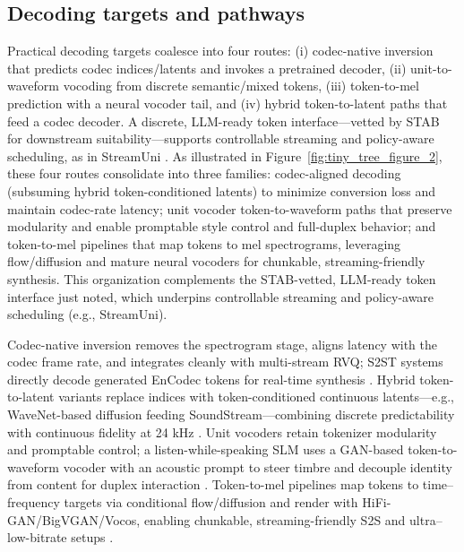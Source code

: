 \documentclass{article}
\begin{document}
\subsection{Decoding targets and pathways} \label{subsec:decodingtargetsandpathways}
Practical decoding targets coalesce into four routes: (i) codec-native inversion that predicts codec indices/latents and invokes a pretrained decoder, (ii) unit-to-waveform vocoding from discrete semantic/mixed tokens, (iii) token-to-mel prediction with a neural vocoder tail, and (iv) hybrid token-to-latent paths that feed a codec decoder. A discrete, LLM-ready token interface---vetted by STAB for downstream suitability---supports controllable streaming and policy-aware scheduling, as in StreamUni \cite{vashishth2024stabspeechtokenizerassessmentbenchmark,guo2025streamuniachievingstreamingspeechtransla}. As illustrated in Figure~\ref{fig:tiny_tree_figure_2}, these four routes consolidate into three families: codec-aligned decoding (subsuming hybrid token-conditioned latents) to minimize conversion loss and maintain codec-rate latency; unit vocoder token-to-waveform paths that preserve modularity and enable promptable style control and full-duplex behavior; and token-to-mel pipelines that map tokens to mel spectrograms, leveraging flow/diffusion and mature neural vocoders for chunkable, streaming-friendly synthesis. This organization complements the STAB-vetted, LLM-ready token interface just noted, which underpins controllable streaming and policy-aware scheduling (e.g., StreamUni).

Codec-native inversion removes the spectrogram stage, aligns latency with the codec frame rate, and integrates cleanly with multi-stream RVQ; S2ST systems directly decode generated EnCodec tokens for real-time synthesis \cite{peng2024mslms2stmultitaskspeechlanguagemodeltext}. Hybrid token-to-latent variants replace indices with token-conditioned continuous latents---e.g., WaveNet-based diffusion feeding SoundStream---combining discrete predictability with continuous fidelity at 24 kHz \cite{yang2025diffsoundstreamefficientspeechtokenizati}. Unit vocoders retain tokenizer modularity and promptable control; a listen-while-speaking SLM uses a GAN-based token-to-waveform vocoder with an acoustic prompt to steer timbre and decouple identity from content for duplex interaction \cite{ma2024languagemodelcanlistenwhilespeaking}. Token-to-mel pipelines map tokens to time--frequency targets via conditional flow/diffusion and render with HiFi-GAN/BigVGAN/Vocos, enabling chunkable, streaming-friendly S2S and ultra--low-bitrate setups \cite{zeng2024scalingspeechtextpretrainingsyntheticint,wang2025tadicodectextawarediffusionspeechtokeniz}.
\end{document}
